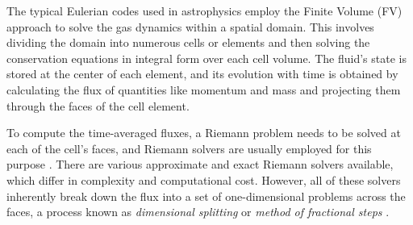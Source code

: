 The typical Eulerian codes used in astrophysics employ the Finite Volume (FV) approach to solve the gas dynamics within a spatial domain. This involves dividing the domain into numerous cells or elements and then solving the conservation equations in integral form over each cell volume. The fluid's state is stored at the center of each element, and its evolution with time is obtained by calculating the flux of quantities like momentum and mass and projecting them through the faces of the cell element.

To compute the time-averaged fluxes, a Riemann problem needs to be solved at each of the cell's faces, and Riemann solvers are usually employed for this purpose \cite{Stone2008Athena:MHD}. There are various approximate \cite{LeVeque1992NumericalLaws, Toro2009RiemannDynamics} and exact Riemann solvers \cite{Godunov1959FiniteDynamics} available, which differ in complexity and computational cost. However, all of these solvers inherently break down the flux into a set of one-dimensional problems across the faces, a process known as \textit{dimensional splitting} or \textit{method of fractional steps} \cite{Toro2009RiemannDynamics, Yanenko1971TheSteps}.






